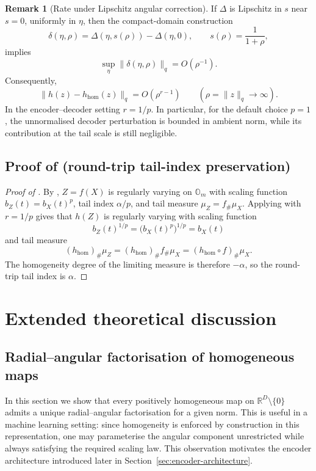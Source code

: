\documentclass{article}
\theoremstyle{definition}
\newtheorem{remark}[theorem]{Remark}
\begin{document}
\begin{remark}[Rate under Lipschitz angular correction]
If \(\Delta\) is Lipschitz in \(s\) near \(s=0\), uniformly in \(\eta\), then
the compact-domain construction
\[
\delta(\eta,\rho)
=
\Delta(\eta,s(\rho))-\Delta(\eta,0),
\qquad
s(\rho)=\frac{1}{1+\rho},
\]
implies
\[
\sup_{\eta}\|\delta(\eta,\rho)\|_q
=
O(\rho^{-1}).
\]
Consequently,
\[
\|h(z)-h_{\mathrm{hom}}(z)\|_q
=
O(\rho^{r-1})
\qquad
(\rho=\|z\|_q\to\infty).
\]
In the encoder--decoder setting \(r=1/p\). In particular, for the default
choice \(p=1\), the unnormalised decoder perturbation is bounded in ambient
norm, while its contribution at the tail scale is still negligible.
\end{remark}

\subsection{Proof of
\texorpdfstring{}{Corollary~\ref*{cor:tail-index-preservation}}
(round-trip tail-index preservation)}
\label{sec:appendix:proof-tail-index-preservation}

\begin{proof}[Proof of ]
By , \(Z=f(X)\) is regularly varying on \(\mathbb{O}_m\) with scaling function \(b_Z(t)=b_X(t)^p\), tail index \(\alpha/p\), and tail measure \(\mu_Z=f_{\#}\mu_X\). Applying  with \(r=1/p\) gives that \(h(Z)\) is regularly varying with scaling function
\[
b_Z(t)^{1/p}=\bigl(b_X(t)^p\bigr)^{1/p}=b_X(t)
\]
and tail measure
\[
(h_{\mathrm{hom}})_{\#}\mu_Z=(h_{\mathrm{hom}})_{\#}f_{\#}\mu_X=(h_{\mathrm{hom}}\circ f)_{\#}\mu_X.
\]
The homogeneity degree of the limiting measure is therefore \(-\alpha\), so the round-trip tail index is \(\alpha\).
\end{proof}

\section{Extended theoretical discussion}
\label{sec:appendix:extra-theory}

\subsection{Radial--angular factorisation of homogeneous maps}
\label{sec:appendix:canonical-form}

In this section we show that every positively homogeneous map on
\(\mathbb{R}^D\setminus\{0\}\) admits a unique radial--angular factorisation
for a given norm. This is useful in a machine learning setting: since homogeneity is enforced by construction in this representation, one may parameterise the angular component unrestricted while always satisfying the required scaling law. This observation motivates the encoder architecture introduced later in
Section~\ref{sec:encoder-architecture}.
\end{document}
